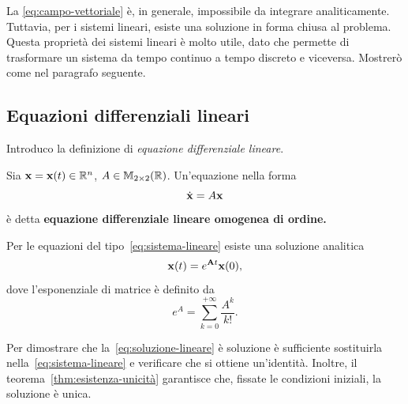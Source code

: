 La \eqref{eq:campo-vettoriale} è, in generale, impossibile da integrare analiticamente.
Tuttavia, per i sistemi lineari, esiste una soluzione in forma chiusa al problema.
Questa proprietà dei sistemi lineari è molto utile, dato che permette di trasformare un sistema
da tempo continuo a tempo discreto e viceversa.
Mostrerò come nel paragrafo seguente.


\subsection{Equazioni differenziali lineari}
\label{subsec:equazioni-differenziali-lineari}
Introduco la definizione di \emph{equazione differenziale lineare}.
\begin{definition}
    Sia $\mathbf{x} = \mathbf{x}(t) \in \mathbb{R}^n$, $A \in \mathbb{M}_{2\times 2}(\mathbb{R})$. Un'equazione nella forma
    \begin{equation}
        \dot{\mathbf{x}} = A \mathbf{x}
        \label{eq:sistema-lineare}
    \end{equation}
    è detta \textbf{equazione differenziale lineare omogenea di  ordine.}
    \label{def:sistema-lineare}
\end{definition}

Per le equazioni del tipo~\eqref{eq:sistema-lineare} esiste una soluzione analitica
\begin{equation}
    \mathbf{x}(t) = e^{\mathbf{A} t} \mathbf{x}(0),
    \label{eq:soluzione-lineare}
\end{equation}
dove l'esponenziale di matrice è definito da
\begin{equation*}
    e^{A} = \sum_{k=0}^{+\infty} \frac{A^k}{k!}.
\end{equation*}

Per dimostrare che la~\eqref{eq:soluzione-lineare} è soluzione è
sufficiente sostituirla nella~\eqref{eq:sistema-lineare} e verificare che
si ottiene un'identità.
Inoltre, il teorema~\ref{thm:esistenza-unicità} garantisce che,
fissate le condizioni iniziali, la
soluzione è unica.

